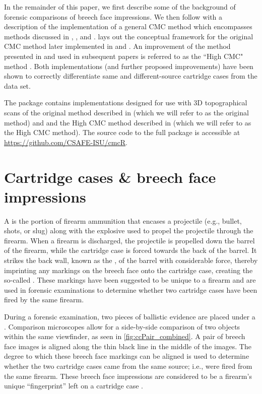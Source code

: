In the remainder of this paper, we first describe some of the background
of forensic comparisons of breech face impressions. We then follow with
a description of the implementation of a general CMC method which
encompasses methods discussed in \citet{song_proposed_2013},
\citet{song_3d_2014}, and \citet{tong_improved_2015}.
\citet{song_proposed_2013} lays out the conceptual framework for the
original CMC method later implemented in \citet{song_3d_2014} and
\cite{tong_fired_2014}. An improvement of the method presented in
\citet{tong_improved_2015} and used in subsequent papers is referred to
as the ``High CMC" method \citep{chen_convergence_2017}. Both
implementations (and further proposed improvements) have been shown to
correctly differentiate same and different-source cartridge cases from
the \citet{fadul_empirical_2011} data set.

The  package contains implementations designed for use
with 3D topographical scans of the original method described in
\citet{song_proposed_2013} (which we will refer to as the original
method) and \citet{song_3d_2014} and the High CMC method described in
\citet{tong_improved_2015} (which we will refer to as the High CMC
method). The source code to the full  package is
accessible at \url{https://github.com/CSAFE-ISU/cmcR}.

\hypertarget{cartridgeCases_bfImpressions}{%
\section{Cartridge cases \& breech face
impressions}\label{cartridgeCases_bfImpressions}}

A  is the portion of firearm ammunition that encases
a projectile (e.g., bullet, shots, or slug) along with the explosive
used to propel the projectile through the firearm. When a firearm is
discharged, the projectile is propelled down the barrel of the firearm,
while the cartridge case is forced towards the back of the barrel. It
strikes the back wall, known as the , of the barrel
with considerable force, thereby imprinting any markings on the breech
face onto the cartridge case, creating the so-called
. These markings have been suggested to be
unique to a firearm and are used in forensic examinations to determine
whether two cartridge cases have been fired by the same firearm.

During a forensic examination, two pieces of ballistic evidence are
placed under a . Comparison microscopes allow
for a side-by-side comparison of two objects within the same viewfinder,
as seen in \autoref{fig:ccPair_combined}. A pair of breech face images
is aligned along the thin black line in the middle of the images. The
degree to which these breech face markings can be aligned is used to
determine whether the two cartridge cases came from the same source;
i.e., were fired from the same firearm. These breech face impressions
are considered to be a firearm's unique ``fingerprint'' left on a
cartridge case \citep{firearm_id_thompson}.

